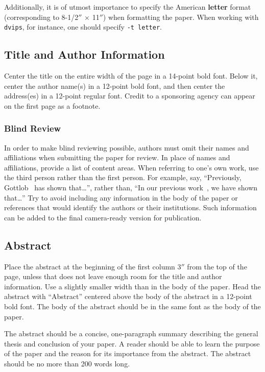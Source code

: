 \documentclass{article}
\theoremstyle{definition}
\begin{document}
Additionally, it is of utmost importance to specify the American {\bf
letter} format (corresponding to 8-1/2$''$ $\times$ 11$''$) when
formatting the paper. When working with {\tt dvips}, for instance, one
should specify {\tt -t letter}.

\subsection{Title and Author Information}

Center the title on the entire width of the page in a 14-point bold
font. Below it, center the author name(s) in a 12-point bold font, and
then center the address(es) in a 12-point regular font. Credit to a
sponsoring agency can appear on the first page as a footnote.

\subsubsection{Blind Review}

In order to make blind reviewing possible, authors must omit their
names and affiliations when submitting the paper for review. In place
of names and affiliations, provide a list of content areas. When
referring to one's own work, use the third person rather than the
first person. For example, say, ``Previously,
Gottlob~ has shown that\ldots'', rather
than, ``In our previous work~\cite{gottlob:nonmon}, we have shown
that\ldots'' Try to avoid including any information in the body of the
paper or references that would identify the authors or their
institutions. Such information can be added to the final camera-ready
version for publication.

\subsection{Abstract}

Place the abstract at the beginning of the first column 3$''$ from the
top of the page, unless that does not leave enough room for the title
and author information. Use a slightly smaller width than in the body
of the paper. Head the abstract with ``Abstract'' centered above the
body of the abstract in a 12-point bold font. The body of the abstract
should be in the same font as the body of the paper.

The abstract should be a concise, one-paragraph summary describing the
general thesis and conclusion of your paper. A reader should be able
to learn the purpose of the paper and the reason for its importance
from the abstract. The abstract should be no more than 200 words long.
\end{document}
